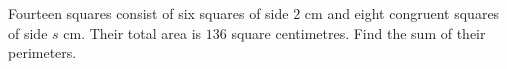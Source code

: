 Fourteen squares consist of six squares of side $2$ cm and eight congruent squares of side $s$ cm. Their total area is $136$ square centimetres. Find the sum of their perimeters.
